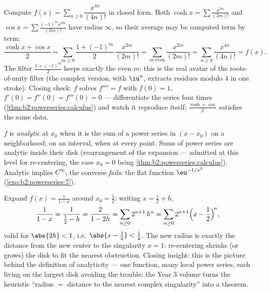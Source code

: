 \begin{example}\label{ex:b2:powerseries:quarter}
Compute $f(x) = \sum_{n\geq0} \dfrac{x^{4n}}{(4n)!}$ in closed
form. Both $\cosh x = \sum \frac{x^{2m}}{(2m)!}$ and $\cos x =
\sum \frac{(-1)^m x^{2m}}{(2m)!}$ have radius $\infty$, so their
average may be computed term by term:
\[
\frac{\cosh x + \cos x}{2}
= \sum_{m\geq0}\frac{1 + (-1)^m}{2}\,\frac{x^{2m}}{(2m)!}
= \sum_{m \text{ even}}\frac{x^{2m}}{(2m)!}
= \sum_{n\geq0}\frac{x^{4n}}{(4n)!} = f(x) .
\]
The filter $\frac{1+(-1)^m}{2}$ keeps exactly the even $m$: this
is the real avatar of the roots-of-unity filter (the complex
version, with $\iu^n$, extracts residues modulo $4$ in one
stroke). Closing check: $f$ solves $f'''' = f$ with $f(0) = 1$,
$f'(0) = f''(0) = f'''(0) = 0$ --- differentiate the series four
times (\cref{thm:b2:powerseries:calculus}) and watch it
reproduce itself; $\frac{\cosh + \cos}{2}$ satisfies the same
data.
\end{example}

\begin{definition}\label{def:b2:powerseries:analytic}
$f$ is \emph{analytic} at $x_0$ when it is
the sum of a power series in $(x - x_0)$ on a neighborhood; on an
interval, when at every point. Sums of power series are analytic
inside their disk (rearrangement of the expansion --- admitted at
this level for re-centering, the case $x_0 = 0$ being
\cref{thm:b2:powerseries:calculus}). Analytic implies $C^\infty$;
the converse \emph{fails}: the flat function $\eu^{-1/x^2}$
(\cref{exo:b2:powerseries:7}).
\end{definition}

\begin{example}\label{ex:b2:powerseries:recenter}
Expand $f(x) = \frac{1}{1-x}$ around $x_0 = \frac12$: writing
$x = \frac12 + h$,
\[
\frac{1}{1 - x} = \frac{1}{\frac12 - h}
= \frac{2}{1 - 2h}
= \sum_{n\geq0} 2^{n+1}\,h^n
= \sum_{n\geq0} 2^{n+1}\Bigl(x - \frac12\Bigr)^{\!n},
\]
valid for $\abs{2h} < 1$, i.e.\ $\abs{x - \frac12} < \frac12$.
The new radius is exactly the distance from the new center to
the singularity $x = 1$: re-centering shrinks (or grows) the
disk to fit the nearest obstruction. Closing insight: this is
the picture behind the definition of analyticity --- one
function, many local power series, each living on the largest
disk avoiding the trouble; the Year 3 volume turns the
heuristic ``radius $=$ distance to the nearest complex
singularity'' into a theorem.
\end{example}

